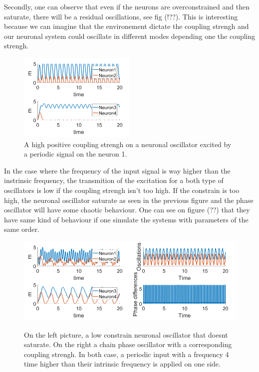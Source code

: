 \documentclass[a4paper]{scrartcl}
\begin{document}
Secondly, one can observe that even if the neurons are overconstrained and then saturate, there will be a residual oscillations, see fig (!??). This is interesting because we can imagine that the environement dictate the coupling strengh and our neuronal system could oscillate in different modes depending one the coupling strengh.

\begin{figure}[!h]
	\centering
	\includegraphics[width=0.5\textwidth]{fig/sat.png}
	\caption{A high positive coupling strengh on a neuronal oscillator excited by a periodic signal on the neuron 1.}
\end{figure}

\newpage

In the case where the frequency of the input signal is way higher than the instrinsic frequency, the transmition of the excitation for a both type of oscillators is low if the coupling strengh isn't too high. If the constrain is too high, the neuronal oscillator saturate as seen in the previous figure and the phase oscillator will have some chaotic behaviour. One can see on figure (??) that they have same kind of behaviour if one simulate the systems with parameters of the same order.

\begin{figure}[!h]
	\centering
	\includegraphics[width=0.5\textwidth]{fig/dd.png}\includegraphics[width=0.5\textwidth]{fig/chao.png}
	\caption{On the left picture, a low constrain neuronal oscillator that doesnt saturate. On the right a chain phase oscillator with a corresponding coupling strengh. In both case, a periodic input with a frequency 4 time higher than their intrinsic frequency is applied on one side.}
\end{figure}
	
\end{document}
